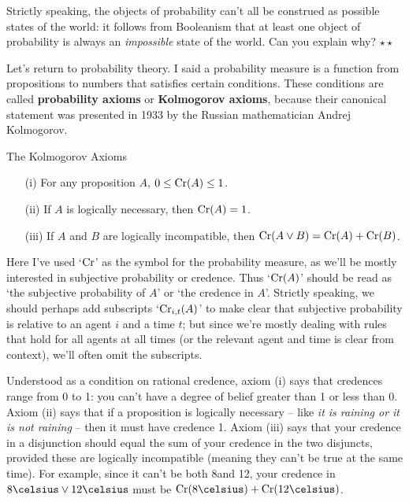 \begin{exercise}
  Strictly speaking, the objects of probability can't all be construed
  as possible states of the world: it follows from Booleanism that at
  least one object of probability is always an \emph{impossible} state
  of the world. Can you explain why? $\star\star$
\end{exercise}
  

Let's return to probability theory. I said a probability measure is a
function from propositions to numbers that satisfies certain
conditions.  These conditions are called \textbf{probability
  axioms} or \textbf{Kolmogorov axioms}, because their canonical
statement was presented in 1933 by the Russian mathematician Andrej Kolmogorov.
\begin{genericthm}{The Kolmogorov Axioms}
  \leavevmode\vspace{-2em}
  \begin{itemize}
  \itemsep0em 
  \item[(i)] For any proposition $A$, $0 \leq \text{Cr}(A) \leq 1$.
  \item[(ii)] If $A$ is logically necessary, then $\text{Cr}(A) = 1$.
  \item[(iii)] If $A$ and $B$ are logically incompatible, then $\text{Cr}(A \lor B) = \text{Cr}(A) + \text{Cr}(B)$.
  \end{itemize}
\end{genericthm}

Here I've used `$\text{Cr}$' as the symbol for the probability measure, as
we'll be mostly interested in subjective probability or credence. Thus
`$\text{Cr}(A)$' should be read as `the subjective probability of $A$' or
`the credence in $A$'. Strictly speaking, we should perhaps add
subscripts `$\text{Cr}_{i,t}(A)$' to make clear that subjective probability
is relative to an agent $i$ and a time $t$; but since we're mostly
dealing with rules that hold for all agents at all times (or the
relevant agent and time is clear from context), we'll often omit the
subscripts.

Understood as a condition on rational credence, axiom (i) says that
credences range from 0 to 1: you can't have a degree of belief greater
than 1 or less than 0. Axiom (ii) says that if a proposition is
logically necessary -- like \emph{it is raining or it is not raining}
-- then it must have credence 1. Axiom (iii) says that your credence
in a disjunction should equal the sum of your credence in the two
disjuncts, provided these are logically incompatible (meaning they
can't be true at the same time). For example, since it can't be both
8\celsius and 12\celsius, your credence in $8\celsius \lor 12\celsius$
must be $\Cr(\text{8\celsius}) + \Cr(\text{12\celsius})$.

